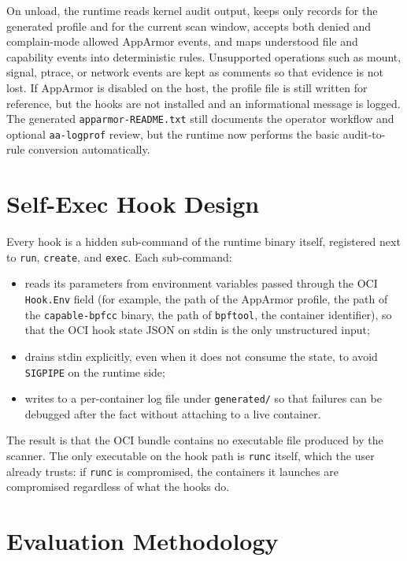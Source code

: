 On unload, the runtime reads kernel audit output, keeps only records for the generated profile and for the current scan window, accepts both denied and complain-mode allowed AppArmor events, and maps understood file and capability events into deterministic rules. Unsupported operations such as mount, signal, ptrace, or network events are kept as comments so that evidence is not lost. If AppArmor is disabled on the host, the profile file is still written for reference, but the hooks are not installed and an informational message is logged. The generated \texttt{apparmor-README.txt} still documents the operator workflow and optional \texttt{aa-logprof} review, but the runtime now performs the basic audit-to-rule conversion automatically.

\section{Self-Exec Hook Design}\label{sec:design-selfexec}

Every hook is a hidden sub-command of the runtime binary itself, registered next to \texttt{run}, \texttt{create}, and \texttt{exec}. Each sub-command:

\begin{itemize}
    \item reads its parameters from environment variables passed through the OCI \texttt{Hook.Env} field (for example, the path of the AppArmor profile, the path of the \texttt{capable-bpfcc} binary, the path of \texttt{bpftool}, the container identifier), so that the OCI hook state JSON on stdin is the only unstructured input;
    \item drains stdin explicitly, even when it does not consume the state, to avoid \texttt{SIGPIPE} on the runtime side;
    \item writes to a per-container log file under \texttt{generated/} so that failures can be debugged after the fact without attaching to a live container.
\end{itemize}

The result is that the OCI bundle contains no executable file produced by the scanner. The only executable on the hook path is \texttt{runc} itself, which the user already trusts: if \texttt{runc} is compromised, the containers it launches are compromised regardless of what the hooks do.

\section{Evaluation Methodology}\label{sec:design-eval}

